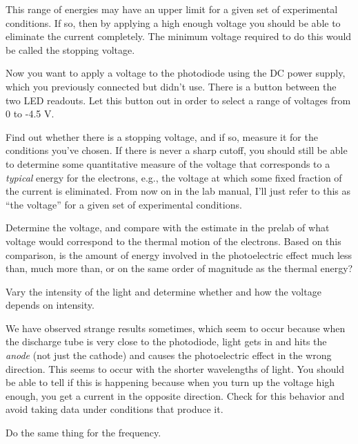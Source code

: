 This range of energies may have an upper limit for a given set of experimental conditions.
If so, then by applying a high enough voltage you should be able to eliminate the current
completely. The minimum voltage required to do this would be called the stopping voltage.

Now you want to apply a voltage to the photodiode using the DC power supply, which you previously
connected but didn't use.
There is a button between the
two LED readouts. Let this button out in order to select a range of voltages from 0 to -4.5 V.

Find out whether there is a stopping voltage, and if so, measure it for the conditions you've chosen.
If there is never a sharp cutoff, you should still be able to determine some quantitative measure
of the voltage that corresponds to a \emph{typical} energy for the electrons, e.g., the voltage at
which some fixed fraction of the current is eliminated. From now on in the lab manual, I'll
just refer to this as ``the voltage'' for a given set of experimental conditions.

Determine the voltage, and compare with the estimate in the prelab of what voltage would
correspond to the thermal motion of the electrons. Based on this comparison, is the amount of
energy involved in the photoelectric effect much less than, much more than, or on the same
order of magnitude as the thermal energy?


Vary the intensity of the light and determine whether and how the voltage depends on intensity.

We have observed strange results sometimes, which seem to occur because when the discharge tube is
very close to the photodiode, light gets in and hits the \emph{anode} (not just the cathode) and
causes the photoelectric effect in the wrong direction. This seems to occur with the shorter wavelengths
of light. You should be able to tell if this is happening because when you turn up the voltage high
enough, you get a current in the opposite direction. Check for this behavior and avoid taking data
under conditions that produce it.


Do the same thing for the frequency.

\analysis

